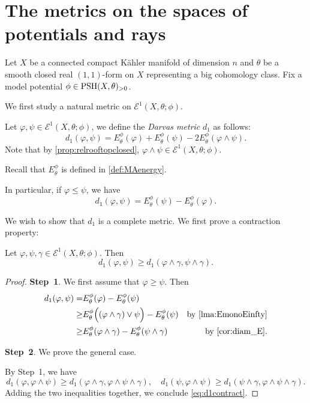 \section{The metrics on the spaces of potentials and rays}\label{sec:metE1}

Let $X$ be a connected compact Kähler manifold of dimension $n$ and $\theta$ be a smooth closed real $(1,1)$-form on $X$ representing a big cohomology class.
Fix a model potential $\phi\in \mathrm{PSH}(X,\theta)_{>0}$.

We first study a natural metric on $\mathcal{E}^1(X,\theta;\phi)$.

\begin{definition}\label{def:d1onE12}
    Let $\varphi,\psi\in \mathcal{E}^1(X,\theta;\phi)$, we define the \emph{Darvas metric} $d_1$ as follows:
    \[
        d_1(\varphi,\psi)=E_{\theta}^{\phi}(\varphi)+E_{\theta}^{\phi}(\psi)-2E_{\theta}^{\phi}(\varphi\land \psi).
    \]
    Note that by \cref{prop:relrooftopclosed}, $\varphi\land \psi\in \mathcal{E}^1(X,\theta;\phi)$.
\end{definition}
Recall that $E_{\theta}^{\phi}$ is defined in \cref{def:MAenergy}.

In particular, if $\varphi\leq \psi$, we have
\begin{equation}\label{eq:d1asEdiff}
    d_1(\varphi,\psi)=E_{\theta}^{\phi}(\psi)-E_{\theta}^{\phi}(\varphi).
\end{equation}

We wish to show that $d_1$ is a complete metric. We first prove a contraction property:
\begin{proposition}\label{prop:d1contract}
    Let $\varphi,\psi,\gamma\in \mathcal{E}^1(X,\theta;\phi)$. Then
    \begin{equation}\label{eq:d1contract}
    d_1(\varphi,\psi)\geq d_1(\varphi\land \gamma,\psi\land \gamma).
    \end{equation}
\end{proposition}
\begin{proof}
    \textbf{Step~1}. We first assume that $\varphi\geq \psi$. Then
    \[
    \begin{aligned}
        d_1(\varphi,\psi)=& E_{\theta}^{\phi}(\varphi)-E_{\theta}^{\phi}(\psi)\\
        \geq & E_{\theta}^{\phi}\Bigl((\varphi\land \gamma)\lor \psi\Bigr)-E_{\theta}^{\phi}(\psi) & \textup{by \cref{lma:EmonoEinfty}}\\
        \geq & E_{\theta}^{\phi}(\varphi\land \gamma)-E_{\theta}^{\phi}(\psi\land \gamma)&\textup{by \cref{cor:diam_E}}.
    \end{aligned}
    \]

    \textbf{Step~2}. We prove the general case.

    By Step~1, we have
    \[
    d_1(\varphi,\varphi\land \psi)\geq d_1(\varphi\land \gamma,\varphi\land \psi\land \gamma),\quad d_1(\psi,\varphi\land \psi)\geq d_1(\psi\land \gamma,\varphi\land \psi\land \gamma).
    \]
    Adding the two inequalities together, we conclude \eqref{eq:d1contract}.
\end{proof}



